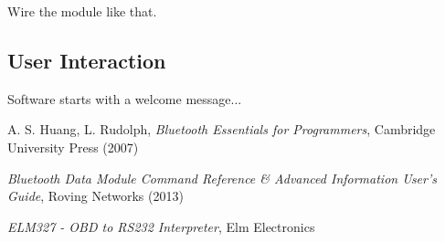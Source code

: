 \documentclass[twoside]{article}
\begin{document}
\begin{multicols}{2}
Wire the module like that.

\subsection{User Interaction}

Software starts with a welcome message...



\begin{thebibliography}{99} %

\bibitem{} A. S. Huang, L. Rudolph,
  \emph{Bluetooth Essentials for Programmers},
  Cambridge University Press (2007)

\bibitem{}
  \emph{Bluetooth Data Module Command Reference \& Advanced Information User's Guide},
  Roving Networks (2013)
  
\bibitem{}
  \emph{ELM327 - OBD to RS232 Interpreter},
  Elm Electronics
 
\end{thebibliography}


\end{multicols}
\end{document}
